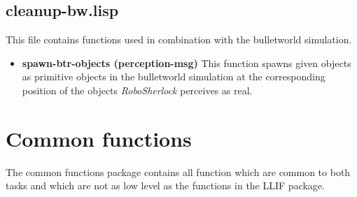 \documentclass[main.tex]{subfiles}
\begin{document}
	    \subsection{cleanup-bw.lisp}
        This file contains functions used in combination with the bulletworld simulation.
		\begin{itemize}
			\item \textbf{spawn-btr-objects (perception-msg)}
			This function spawns given objects as primitive objects in the bulletworld simulation at the corresponding position of the objects \textit{RoboSherlock} perceives as real.
		\end{itemize}
	  	
	  	\section{Common functions}
	  	\label{comf}
	  	
		The common functions package contains all function which are common to both tasks and which are not as low level as the functions in the LLIF package.
\end{document}
